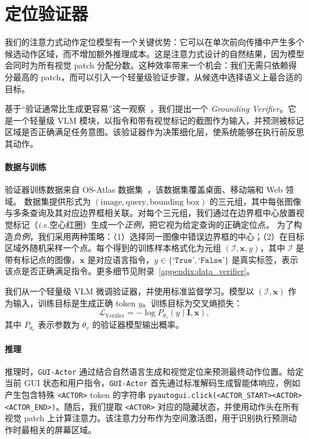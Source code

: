 \documentclass{article}
\newcommand{\ie}{\textit{i.e.}}
\newcommand{\sys}{\texttt{GUI-Actor}\xspace}
\begin{document}
\section{定位验证器}
我们的注意力式动作定位模型有一个关键优势：它可以在单次前向传播中产生多个候选动作区域，而不增加额外推理成本。这是注意力式设计的自然结果，因为模型会同时为所有视觉 patch 分配分数。这种效率带来一个机会：我们无需只依赖得分最高的 patch，而可以引入一个轻量级验证步骤，从候选中选择语义上最合适的目标。

基于“验证通常比生成更容易”这一观察~\citep{cobbe2021training}，我们提出一个 \textit{Grounding Verifier}。它是一个轻量级 VLM 模块，以指令和带有视觉标记的截图作为输入，并预测被标记区域是否正确满足任务意图。该验证器作为决策细化层，使系统能够在执行前反思其动作。

\paragraph{数据与训练}
验证器训练数据来自 OS-Atlas 数据集~\cite{wu2024atlas}，该数据集覆盖桌面、移动端和 Web 领域。
数据集提供形式为 $(\text{image}, \text{query}, \text{bounding box})$ 的三元组，其中每张图像与多条查询及其对应边界框相关联。对每个三元组，我们通过在边界框中心放置视觉标记（\ie 空心红圈）生成一个\textit{正例}，把它视为给定查询的正确定位点。
为了构造\textit{负例}，我们采用两种策略：（1）选择同一图像中错误边界框的中心；（2）在目标区域外随机采样一个点。每个得到的训练样本格式化为元组 $(\mathcal{I}, \mathbf{x}, y)$，其中 $\mathcal{I}$ 是带有标记点的图像，$\mathbf{x}$ 是对应语言指令，$y \in \{\texttt{`True'}, \texttt{`False'}\}$ 是真实标签，表示该点是否正确满足指令。更多细节见附录~\ref{appendix:data_verifier}。

我们从一个轻量级 VLM 微调验证器，并使用标准监督学习。模型以 $(\mathcal{I}, \mathbf{x})$ 作为输入，训练目标是生成正确 token $y$。训练目标为交叉熵损失：
\[
\mathcal{L}_{\text{Verifier}} = - \log P_{\theta_v}(y \mid \mathbf{I}, \mathbf{x}),
\]
其中 $P_{\theta_v}$ 表示参数为 $\theta_v$ 的验证器模型输出概率。

\paragraph{推理}
推理时，\sys 通过结合自然语言生成和视觉定位来预测最终动作位置。给定当前 GUI 状态和用户指令，\sys 首先通过标准解码生成智能体响应，例如产生包含特殊 \texttt{<ACTOR>} token 的字符串 \texttt{pyautogui.click(<ACTOR\_START><ACTOR><ACTOR\_END>)}。随后，我们提取 \texttt{<ACTOR>} 对应的隐藏状态，并使用动作头在所有视觉 patch 上计算注意力。该注意力分布作为空间激活图，用于识别执行预测动作时最相关的屏幕区域。
\end{document}
